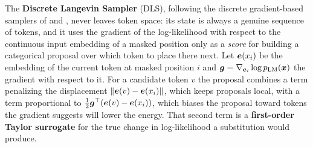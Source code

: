 The \textbf{Discrete Langevin Sampler} (DLS), following the discrete gradient-based samplers of \citet{grathwohl2021oops} and \citet{zhang2022langevin}, never leaves token space: its state is always a genuine sequence of tokens, and it uses the gradient of the log-likelihood with respect to the continuous input embedding of a masked position only as a \emph{score} for building a categorical proposal over which token to place there next. Let $\bm{e}(x_i)$ be the embedding of the current token at masked position $i$ and $\bm{g} = \nabla_{\bm{e}_i}\log p_{\text{LM}}(\bm{x})$ the gradient with respect to it. For a candidate token $v$ the proposal combines a term penalizing the displacement $\left\lVert\bm{e}(v) - \bm{e}(x_i)\right\rVert$, which keeps proposals local, with a term proportional to $\tfrac{1}{2}\bm{g}^\top(\bm{e}(v) - \bm{e}(x_i))$, which biases the proposal toward tokens the gradient suggests will lower the energy. That second term is a \textbf{first-order Taylor surrogate} for the true change in log-likelihood a substitution would produce.

